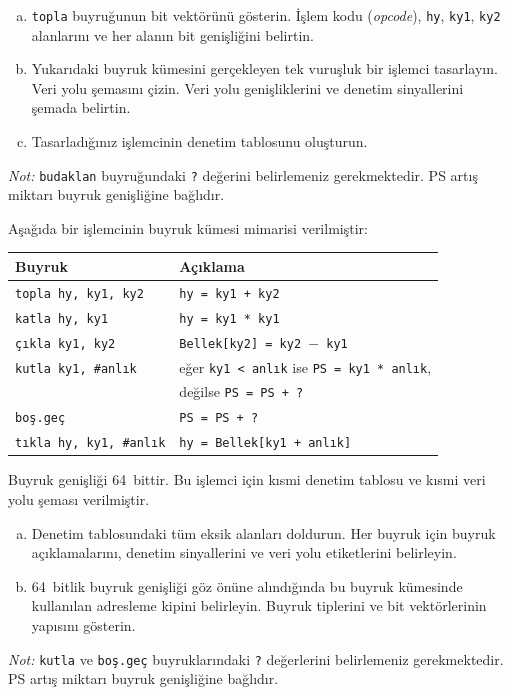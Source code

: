 \begin{alistirma}[\zor]
\begin{enumerate}[(a)]
    \item \texttt{topla} buyruğunun bit vektörünü gösterin. İşlem kodu (\emph{opcode}), \texttt{hy}, \texttt{ky1}, \texttt{ky2} alanlarını ve her alanın bit genişliğini belirtin.
    \item Yukarıdaki buyruk kümesini gerçekleyen tek vuruşluk bir işlemci tasarlayın. Veri yolu şemasını çizin. Veri yolu genişliklerini ve denetim sinyallerini şemada belirtin.
    \item Tasarladığınız işlemcinin denetim tablosunu oluşturun.
\end{enumerate}

\emph{Not:} \texttt{budaklan} buyruğundaki \texttt{?} değerini belirlemeniz gerekmektedir. PS artış miktarı buyruk genişliğine bağlıdır.
\end{alistirma}

\begin{alistirma}[\orta]
Aşağıda bir işlemcinin buyruk kümesi mimarisi verilmiştir:

\begin{center}
\small
\begin{tabular}{ll}
\toprule
\textbf{Buyruk} & \textbf{Açıklama} \\
\midrule
\texttt{topla hy, ky1, ky2} & \texttt{hy = ky1 + ky2} \\
\texttt{katla hy, ky1} & \texttt{hy = ky1 * ky1} \\
\texttt{çıkla ky1, ky2} & \texttt{Bellek[ky2] = ky2 $-$ ky1} \\
\texttt{kutla ky1, \#anlık} & eğer \texttt{ky1 < anlık} ise \texttt{PS = ky1 * anlık}, \\
 & değilse \texttt{PS = PS + ?} \\
\texttt{boş.geç} & \texttt{PS = PS + ?} \\
\texttt{tıkla hy, ky1, \#anlık} & \texttt{hy = Bellek[ky1 + anlık]} \\
\bottomrule
\end{tabular}
\end{center}

Buyruk genişliği 64~bittir. Bu işlemci için kısmi denetim tablosu ve kısmi veri yolu şeması verilmiştir.

\begin{enumerate}[(a)]
    \item Denetim tablosundaki tüm eksik alanları doldurun. Her buyruk için buyruk açıklamalarını, denetim sinyallerini ve veri yolu etiketlerini belirleyin.
    \item 64~bitlik buyruk genişliği göz önüne alındığında bu buyruk kümesinde kullanılan adresleme kipini belirleyin. Buyruk tiplerini ve bit vektörlerinin yapısını gösterin.
\end{enumerate}

\emph{Not:} \texttt{kutla} ve \texttt{boş.geç} buyruklarındaki \texttt{?} değerlerini belirlemeniz gerekmektedir. PS artış miktarı buyruk genişliğine bağlıdır.
\end{alistirma}

